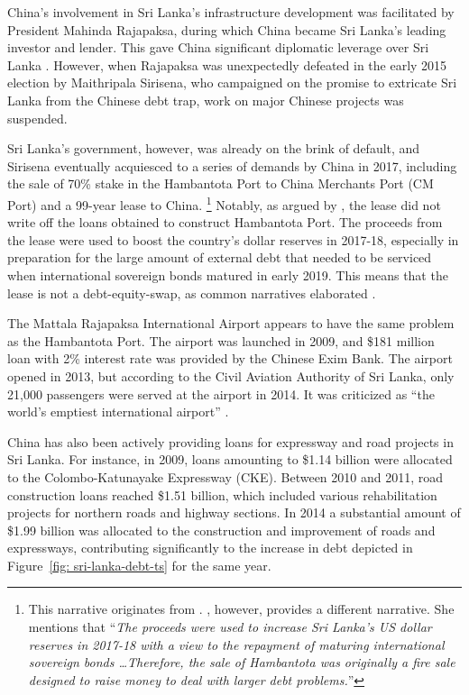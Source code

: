 China's involvement in Sri Lanka's infrastructure development was facilitated by President Mahinda Rajapaksa, during which China became Sri Lanka's leading investor and lender. This gave China significant diplomatic leverage over Sri Lanka \citep*{Chellaney_2017}.
However, when Rajapaksa was unexpectedly defeated in the early 2015 election by Maithripala Sirisena, who campaigned on the promise to extricate Sri Lanka from the Chinese debt trap, work on major Chinese projects was suspended.

Sri Lanka's government, however, was already on the brink of default, and Sirisena eventually acquiesced to a series of demands by China in 2017, including the sale of 70\% stake in the Hambantota Port to China Merchants Port (CM Port) and a 99-year lease to China.%
\footnote{
    This narrative originates from \citet*{Chellaney_2017}. \citet*{Brautigam-meme-2020}, however, provides a different narrative. She mentions that ``\emph{The proceeds were used to increase Sri Lanka's
    US dollar reserves in 2017-18 with a view to the repayment of maturing international sovereign bonds \dots Therefore, the sale of Hambantota was originally a fire sale designed to raise money to deal
    with larger debt problems.}''
}
Notably, as argued by \citet*{Moramudali_2019}, the lease did not write off the loans obtained to construct Hambantota Port. The proceeds from the lease were used to boost the country's dollar reserves in 2017-18, especially in preparation for the large amount of external debt that needed to be serviced when international sovereign bonds matured in early 2019. This means that the lease is not a debt-equity-swap, as common narratives elaborated \citep*{Moramudali_2020}.

The Mattala Rajapaksa International Airport appears to have the same problem as the Hambantota Port. The airport was launched in 2009, and \$181 million loan with 2\% interest rate was provided by the Chinese Exim Bank. The airport opened in 2013, but according to the Civil Aviation Authority of Sri Lanka, only 21,000 passengers were served at the airport in 2014. It was criticized as ``the world's emptiest international airport'' \citep*{shepard-16-airport-empty}.

China has also been actively providing loans for expressway and road projects in Sri Lanka. For instance, in 2009, loans amounting to \$1.14 billion were allocated to the Colombo-Katunayake Expressway (CKE). Between 2010 and 2011, road construction loans reached \$1.51 billion, which included various rehabilitation projects for northern roads and highway sections. In 2014 a substantial amount of \$1.99 billion was allocated to the construction and improvement of roads and expressways, contributing significantly to the increase in debt depicted in Figure~\ref{fig: sri-lanka-debt-ts} for the same year.

